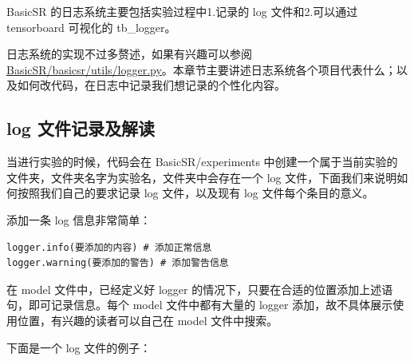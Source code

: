 \documentclass[../main.tex]{subfiles}
\begin{document}
BasicSR 的日志系统主要包括实验过程中1.记录的 log 文件和2.可以通过 tensorboard 可视化的 tb\_logger。

日志系统的实现不过多赘述，如果有兴趣可以参阅 \href{https://github.com/XPixelGroup/BasicSR/blob/master/basicsr/utils/logger.py}{BasicSR/basicsr/utils/logger.py}。本章节主要讲述日志系统各个项目代表什么；以及如何改代码，在日志中记录我们想记录的个性化内容。

\subsection{log 文件记录及解读}

当进行实验的时候，代码会在 BasicSR/experiments 中创建一个属于当前实验的文件夹，文件夹名字为实验名，文件夹中会存在一个 log 文件，下面我们来说明如何按照我们自己的要求记录 log 文件，以及现有 log 文件每个条目的意义。

\begin{hl} %

添加一条 log 信息非常简单：

\begin{verbatim}
logger.info(要添加的内容) # 添加正常信息
logger.warning(要添加的警告) # 添加警告信息
\end{verbatim}
\end{hl}

在 model 文件中，已经定义好 logger 的情况下，只要在合适的位置添加上述语句，即可记录信息。每个 model 文件中都有大量的 logger 添加，故不具体展示使用位置，有兴趣的读者可以自己在 model 文件中搜索。

下面是一个 log 文件的例子：
\end{document}
